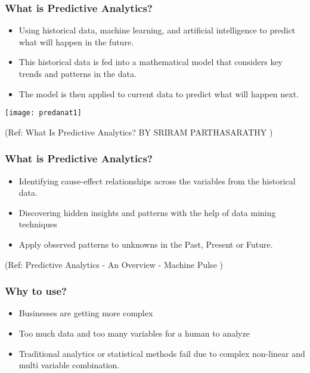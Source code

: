 \begin{frame}\frametitle{What is Predictive Analytics?}

\begin{itemize}
\item Using historical data, machine learning, and artificial intelligence to predict what will happen in the future.  
\item This historical data is fed into a mathematical model that considers key trends and patterns in the data. 
\item The model is then applied to current data to predict what will happen next.
\end{itemize}

\begin{center}
\texttt{[image: predanat1]}
\end{center}


{\tiny (Ref: What Is Predictive Analytics? BY SRIRAM PARTHASARATHY )}

\end{frame}

\begin{frame}\frametitle{What is Predictive Analytics?}

\begin{itemize}
\item Identifying cause-effect relationships across the variables from the historical data.

\item Discovering hidden insights and patterns with the help of data mining
techniques
\item Apply observed patterns to unknowns in the Past, Present or Future.
\end{itemize}


{\tiny (Ref: Predictive Analytics - An Overview - Machine Pulse )}

\end{frame}

\begin{frame}\frametitle{Why to use?}
\begin{itemize}
\item Businesses are getting more complex
\item Too much data and too many variables for a human to analyze
\item Traditional analytics or statistical methods fail due to complex non-linear and multi variable combination.
\end{itemize}
\end{frame}


